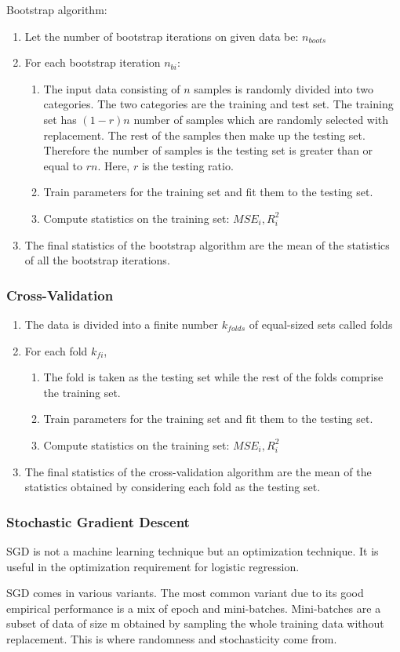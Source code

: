 Bootstrap algorithm:
\begin{enumerate}
    \item Let the number of bootstrap iterations on given data be: $n_{boots}$
    \item For each bootstrap iteration $n_{bi}$:
    \begin{enumerate}
        \item The input data consisting of $n$ samples is randomly divided into two categories. The two categories are the training and test set. The training set has $(1-r)n$  number of samples which are randomly selected with replacement. The rest of the samples then make up the testing set. Therefore the number of samples is the testing set is greater than or equal to $rn$. Here, $r$ is the testing ratio.
        \item Train parameters for the training set and fit them to the testing set.
        \item Compute statistics on the training set: $MSE_i, R^2_i$
    \end{enumerate}
    \item The final statistics of the bootstrap algorithm are the mean of the statistics of all the bootstrap iterations.
\end{enumerate}
\subsubsection{Cross-Validation}\label{subsubsec:cross_validation}
\begin{enumerate}
    \item The data is divided into a finite number $k_{folds}$ of equal-sized sets called folds
    \item For each fold $k_{fi}$,
    \begin{enumerate}
        \item The fold is taken as the testing set while the rest of the folds comprise the training set.
        \item Train parameters for the training set and fit them to the testing set.
        \item Compute statistics on the training set: $MSE_i, R^2_i$
    \end{enumerate}
    \item The final statistics of the cross-validation algorithm are the mean of the statistics obtained by considering each fold as the testing set.
\end{enumerate}

\subsubsection{Stochastic Gradient Descent}\label{subsubsec:SGD}
SGD is not a machine learning technique but an optimization technique. It is useful in the optimization requirement for logistic regression. 

SGD comes in various variants. The most common variant due to its good empirical performance is a mix of epoch and mini-batches. Mini-batches are a subset of data of size m obtained by sampling the whole training data without replacement. This is where randomness and stochasticity come from.